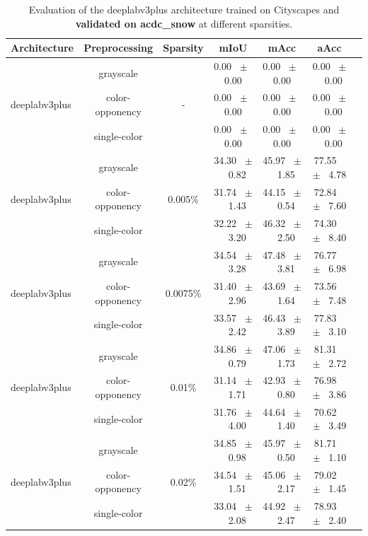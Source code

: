 \begin{table}[h]
  \centering
  \caption{Evaluation of the deeplabv3plus architecture trained on Cityscapes and \textbf{validated on acdc_snow} at different sparsities.}
  \begin{tabular}{@{}lccc ccc@{}}
    \toprule
    Architecture & Preprocessing & Sparsity & mIoU & mAcc & aAcc \\
    \midrule
    \midrule
    \midrule
    \multirow{3}{*}{deeplabv3plus} & grayscale & \multirow{3}{*}{-} & 0.00 ~$\pm$~ 0.00 & 0.00 ~$\pm$~ 0.00 & 0.00 ~$\pm$~ 0.00 \\
    & color-opponency & & 0.00 ~$\pm$~ 0.00 & 0.00 ~$\pm$~ 0.00 & 0.00 ~$\pm$~ 0.00 \\
    & single-color & & 0.00 ~$\pm$~ 0.00 & 0.00 ~$\pm$~ 0.00 & 0.00 ~$\pm$~ 0.00 \\
    \midrule
    \multirow{3}{*}{deeplabv3plus} & grayscale & \multirow{3}{*}{0.005\%} & 34.30 ~$\pm$~ 0.82 & 45.97 ~$\pm$~ 1.85 & 77.55 ~$\pm$~ 4.78 \\
    & color-opponency & & 31.74 ~$\pm$~ 1.43 & 44.15 ~$\pm$~ 0.54 & 72.84 ~$\pm$~ 7.60 \\
    & single-color & & 32.22 ~$\pm$~ 3.20 & 46.32 ~$\pm$~ 2.50 & 74.30 ~$\pm$~ 8.40 \\
    \midrule
    \multirow{3}{*}{deeplabv3plus} & grayscale & \multirow{3}{*}{0.0075\%} & 34.54 ~$\pm$~ 3.28 & 47.48 ~$\pm$~ 3.81 & 76.77 ~$\pm$~ 6.98 \\
    & color-opponency & & 31.40 ~$\pm$~ 2.96 & 43.69 ~$\pm$~ 1.64 & 73.56 ~$\pm$~ 7.48 \\
    & single-color & & 33.57 ~$\pm$~ 2.42 & 46.43 ~$\pm$~ 3.89 & 77.83 ~$\pm$~ 3.10 \\
    \midrule
    \multirow{3}{*}{deeplabv3plus} & grayscale & \multirow{3}{*}{0.01\%} & 34.86 ~$\pm$~ 0.79 & 47.06 ~$\pm$~ 1.73 & 81.31 ~$\pm$~ 2.72 \\
    & color-opponency & & 31.14 ~$\pm$~ 1.71 & 42.93 ~$\pm$~ 0.80 & 76.98 ~$\pm$~ 3.86 \\
    & single-color & & 31.76 ~$\pm$~ 4.00 & 44.64 ~$\pm$~ 1.40 & 70.62 ~$\pm$~ 3.49 \\
    \midrule
    \multirow{3}{*}{deeplabv3plus} & grayscale & \multirow{3}{*}{0.02\%} & 34.85 ~$\pm$~ 0.98 & 45.97 ~$\pm$~ 0.50 & 81.71 ~$\pm$~ 1.10 \\
    & color-opponency & & 34.54 ~$\pm$~ 1.51 & 45.06 ~$\pm$~ 2.17 & 79.02 ~$\pm$~ 1.45 \\
    & single-color & & 33.04 ~$\pm$~ 2.08 & 44.92 ~$\pm$~ 2.47 & 78.93 ~$\pm$~ 2.40 \\
    \midrule
    \bottomrule
  \end{tabular}
  \label{tab:sparse_deeplabv3plus_acdc_snow}
\end{table}